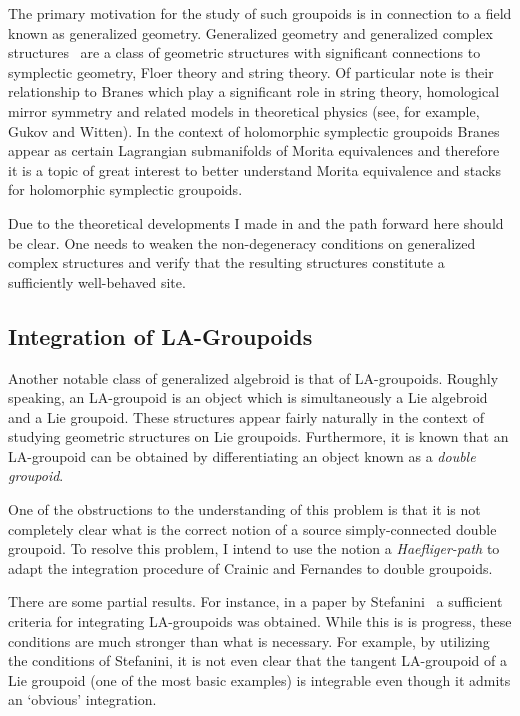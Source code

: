 \documentclass[11pt, letterpaper]{article}
\begin{document}
The primary motivation for the study of such groupoids is in connection to a field known as generalized geometry. Generalized geometry and generalized complex structures~\cite{Hitchin,GCGualt} are a class of geometric structures with significant connections to symplectic geometry, Floer theory and string theory. Of particular note is their relationship to Branes which play a significant role in string theory, homological mirror symmetry and related models in theoretical physics (see, for example, Gukov and Witten\cite{GukovWitten}). In the context of holomorphic symplectic groupoids Branes appear as certain Lagrangian submanifolds of Morita equivalences\cite{BigBraneGualt} and therefore it is a topic of great interest to better understand Morita equivalence and stacks for holomorphic symplectic groupoids.

Due to the theoretical developments I made in \cite{dman} and \cite{MyThesis} the path forward here should be clear. One needs to weaken the non-degeneracy conditions on generalized complex structures and verify that the resulting structures constitute a sufficiently well-behaved site.

\subsection{Integration of LA-Groupoids}\label{proj:vb.algebroids}
Another notable class of generalized algebroid is that of LA-groupoids. Roughly speaking, an LA-groupoid is an object which is simultaneously a Lie algebroid and a Lie groupoid. These structures appear fairly naturally in the context of studying geometric structures on Lie groupoids. Furthermore, it is known that an LA-groupoid can be obtained by differentiating an object known as a \emph{double groupoid}.

One of the obstructions to the understanding of this problem is that it is not completely clear what is the correct notion of a source simply-connected double groupoid. To resolve this problem, I intend to use the notion a \emph{Haefliger-path} to adapt the integration procedure of Crainic and Fernandes to double groupoids.

There are some partial results. For instance, in a paper by Stefanini~\cite{Stefanini} a sufficient criteria for integrating LA-groupoids was obtained. While this is is progress, these conditions are much stronger than what is necessary. For example, by utilizing the conditions of Stefanini, it is not even clear that the tangent LA-groupoid of a Lie groupoid (one of the most basic examples) is integrable even though it admits an `obvious' integration.


\renewcommand{\refname}{References Cited}


\end{document}
